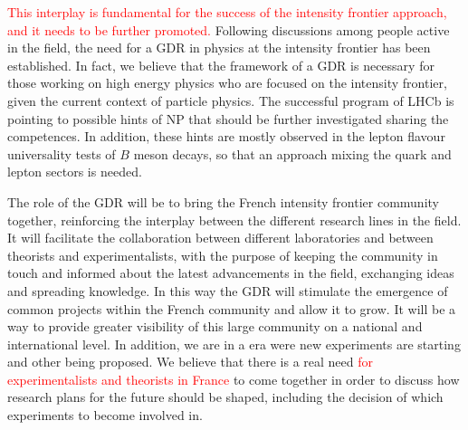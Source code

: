 

\textcolor{red}{This interplay is fundamental for the success of the intensity frontier approach, and it needs to be further promoted.}  
Following discussions among people active in the field, the need for a GDR in physics at the intensity frontier has been established. In fact, we believe that the framework of a GDR is necessary for those working on high energy physics who are focused on the intensity frontier, given the current context of particle physics. The successful program of LHCb is pointing to possible hints of NP that should be further investigated sharing the competences. In addition, these hints are mostly observed in the lepton flavour universality tests of $B$ meson decays, so that an approach mixing the quark and lepton sectors is needed. 

 The role of the GDR will be  to bring the French intensity frontier community together,  reinforcing the interplay between the different research lines in the field. It will facilitate the collaboration between different laboratories and between theorists and experimentalists, with the purpose of keeping the community in touch and informed about the latest advancements in the field, exchanging ideas and spreading knowledge. In this way the GDR will stimulate the emergence of common projects within the French community and allow it to grow. It will be a way to provide greater visibility of this large community on a national and international level. In addition,  we are in a era were new experiments are starting and other being proposed. We believe that there is a real need \textcolor{red}{ for experimentalists and theorists in France }to come together in order to discuss how research plans for the future should be shaped, including the decision of which experiments to become involved in.



